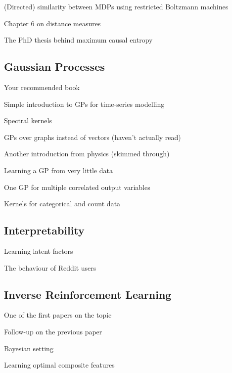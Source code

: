 \documentclass{mprop}
\begin{document}
(Directed) similarity between MDPs using restricted Boltzmann machines
\cite{9401f4eeb9a64c77afb3d087261d1080}

Chapter 6 on distance measures \cite{mccune2002analysis}

The PhD thesis behind maximum causal entropy \cite{Ziebart:2010:MPA:2049078}

\subsection{Gaussian Processes}

Your recommended book \cite{DBLP:books/lib/RasmussenW06}

Simple introduction to GPs for time-series modelling \cite{Roberts2013GaussianPF}

Spectral kernels \cite{pmlr-v28-wilson13}

GPs over graphs instead of vectors (haven't actually read)
\cite{DBLP:journals/corr/abs-1803-05776}

Another introduction from physics (skimmed through) \cite{introduction_to_gps}

Learning a GP from very little data \cite{DBLP:conf/nips/PlattBSWZ01}

One GP for multiple correlated output variables \cite{DBLP:journals/jcphy/BilionisZKL13}

Kernels for categorical and count data \cite{savitsky2011variable}

\subsection{Interpretability}

Learning latent factors \cite{DBLP:conf/nips/LiSE17}

The behaviour of Reddit users \cite{DBLP:conf/atal/DasL14}

\subsection{Inverse Reinforcement Learning}

One of the first papers on the topic \cite{DBLP:conf/icml/NgR00}

Follow-up on the previous paper \cite{DBLP:conf/icml/PieterN04}

Bayesian setting \cite{DBLP:conf/ijcai/RamachandranA07}

Learning optimal composite features \cite{DBLP:conf/ijcai/ChoiK13}
\end{document}
